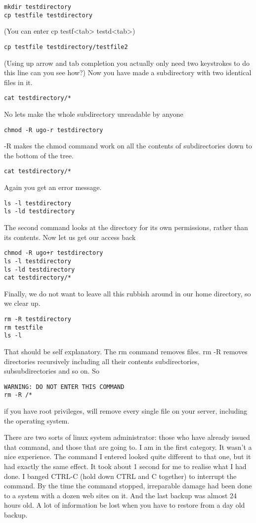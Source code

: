 \documentclass[12pt, a4paper]{article}
\begin{document}
\begin{verbatim}
mkdir testdirectory
cp testfile testdirectory 
\end{verbatim}
(You can enter cp testf<tab> testd<tab>)
\begin{verbatim}
cp testfile testdirectory/testfile2
\end{verbatim}
(Using up arrow and tab completion you actually only need two keystrokes to do this line can you see how?)
Now you have made a subdirectory with two identical files in it.
\begin{verbatim}
cat testdirectory/*
\end{verbatim}
No lets make the whole subdirectory unreadable by anyone
\begin{verbatim}
chmod -R ugo-r testdirectory
\end{verbatim}
-R makes the chmod command work on all the contents of subdirectories down to the bottom of the tree.  
\begin{verbatim}
cat testdirectory/*
\end{verbatim}
Again you get an error message.
\begin{verbatim}
ls -l testdirectory
ls -ld testdirectory
\end{verbatim}
The second command looks at the directory for its own permissions, rather than its contents.
Now let us get our access back
\begin{verbatim}
chmod -R ugo+r testdirectory
ls -l testdirectory
ls -ld testdirectory
cat testdirectory/*
\end{verbatim}
Finally, we do not want to leave all this rubbish around in our home directory, so we clear up.
\begin{verbatim}
rm -R testdirectory
rm testfile
ls -l
\end{verbatim}
That should be self explanatory. The rm command removes files. rm -R removes directories recursively including all their contents subdirectories, subsubdirectories and so on. 
So
\begin{verbatim}
WARNING: DO NOT ENTER THIS COMMAND
rm -R /*
\end{verbatim}
if you have root privileges, will remove every single file on your server, including the operating system.

There are two sorts of linux system administrator: those who have already issued that command, and those that are going to. I am in the first category. It wasn’t a nice experience. The command I entered looked quite different to that one, but it had exactly the same effect. It took about 1 second for me to realise what I had done. I banged CTRL-C (hold down CTRL and C together) to interrupt the command. By the time the command stopped, irreparable damage had been done to a system with a dozen web sites on it.  And the last backup was almost 24 hours old. A lot of information be lost when you have to restore from a day old backup.
\end{document}
